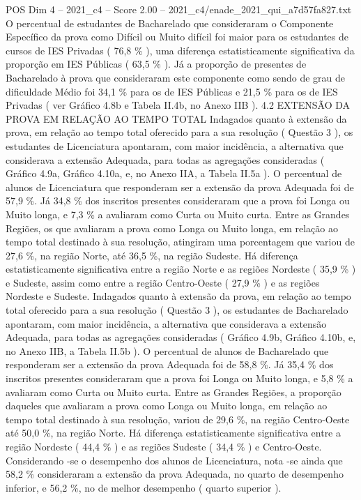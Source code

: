 \begin{textsample}{POS Dim 4 – 2021\_c4 – Score 2.00 – 2021\_c4/enade\_2021\_qui\_a7d57fa827.txt}
O percentual de estudantes de Bacharelado que consideraram o Componente Específico da prova como Difícil ou Muito difícil foi maior para os estudantes de cursos de IES Privadas ( 76,8 \% ), uma diferença estatisticamente significativa da proporção em IES Públicas ( 63,5 \% ).
Já a proporção de presentes de Bacharelado à prova que consideraram este componente como sendo de grau de dificuldade Médio foi 34,1 \% para os de IES Públicas e 21,5 \% para os de IES Privadas ( ver Gráfico 4.8b e Tabela II.4b, no Anexo IIB ). 4.2 EXTENSÃO DA PROVA EM RELAÇÃO AO TEMPO TOTAL Indagados quanto à extensão da prova, em relação ao tempo total oferecido para a sua resolução ( Questão 3 ), os estudantes de Licenciatura apontaram, com maior incidência, a alternativa que considerava a extensão Adequada, para todas as agregações consideradas ( Gráfico 4.9a, Gráfico 4.10a, e, no Anexo IIA, a Tabela II.5a ).
O percentual de alunos de Licenciatura que responderam ser a extensão da prova Adequada foi de 57,9 \%.
Já 34,8 \% dos inscritos presentes consideraram que a prova foi Longa ou Muito longa, e 7,3 \% a avaliaram como Curta ou Muito curta.
Entre as Grandes Regiões, os que avaliaram a prova como Longa ou Muito longa, em relação ao tempo total destinado à sua resolução, atingiram uma porcentagem que variou de 27,6 \%, na região Norte, até 36,5 \%, na região Sudeste.
Há diferença estatisticamente significativa entre a região Norte e as regiões Nordeste ( 35,9 \% ) e Sudeste, assim como entre a região Centro-Oeste ( 27,9 \% ) e as regiões Nordeste e Sudeste.
Indagados quanto à extensão da prova, em relação ao tempo total oferecido para a sua resolução ( Questão 3 ), os estudantes de Bacharelado apontaram, com maior incidência, a alternativa que considerava a extensão Adequada, para todas as agregações consideradas ( Gráfico 4.9b, Gráfico 4.10b, e, no Anexo IIB, a Tabela II.5b ).
O percentual de alunos de Bacharelado que responderam ser a extensão da prova Adequada foi de 58,8 \%.
Já 35,4 \% dos inscritos presentes consideraram que a prova foi Longa ou Muito longa, e 5,8 \% a avaliaram como Curta ou Muito curta.
Entre as Grandes Regiões, a proporção daqueles que avaliaram a prova como Longa ou Muito longa, em relação ao tempo total destinado à sua resolução, variou de 29,6 \%, na região Centro-Oeste até 50,0 \%, na região Norte.
Há diferença estatisticamente significativa entre a região Nordeste ( 44,4 \% ) e as regiões Sudeste ( 34,4 \% ) e Centro-Oeste.
Considerando -se o desempenho dos alunos de Licenciatura, nota -se ainda que 58,2 \% consideraram a extensão da prova Adequada, no quarto de desempenho inferior, e 56,2 \%, no de melhor desempenho ( quarto superior ).

\end{textsample}
